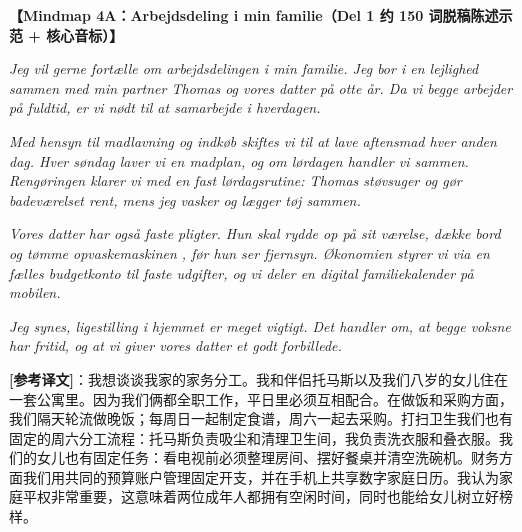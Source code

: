 \begin{answerbox}
\textbf{\color{NCDNavy}【Mindmap 4A：Arbejdsdeling i min familie（Del 1 约 150 词脱稿陈述示范 + 核心音标）】}

\vspace{0.18em}
\textit{Jeg vil gerne fortælle om arbejdsdelingen  i min familie. Jeg bor i en lejlighed sammen med min partner Thomas og vores datter på otte år. Da vi begge arbejder på fuldtid, er vi nødt til at samarbejde i hverdagen.}

\vspace{0.18em}
\textit{Med hensyn til madlavning og indkøb  skiftes vi til at lave aftensmad hver anden dag. Hver søndag laver vi en madplan, og om lørdagen handler vi sammen. Rengøringen klarer vi med en fast lørdagsrutine: Thomas støvsuger og gør badeværelset rent, mens jeg vasker og lægger tøj sammen.}

\vspace{0.18em}
\textit{Vores datter har også faste pligter. Hun skal rydde op på sit værelse, dække bord og tømme opvaskemaskinen , før hun ser fjernsyn. Økonomien  styrer vi via en fælles budgetkonto til faste udgifter, og vi deler en digital familiekalender på mobilen.}

\vspace{0.18em}
\textit{Jeg synes, ligestilling  i hjemmet er meget vigtigt. Det handler om, at begge voksne har fritid, og at vi giver vores datter et godt forbillede.}

\vspace{0.2em}
\small\textbf{[参考译文]}：我想谈谈我家的家务分工。我和伴侣托马斯以及我们八岁的女儿住在一套公寓里。因为我们俩都全职工作，平日里必须互相配合。在做饭和采购方面，我们隔天轮流做晚饭；每周日一起制定食谱，周六一起去采购。打扫卫生我们也有固定的周六分工流程：托马斯负责吸尘和清理卫生间，我负责洗衣服和叠衣服。我们的女儿也有固定任务：看电视前必须整理房间、摆好餐桌并清空洗碗机。财务方面我们用共同的预算账户管理固定开支，并在手机上共享数字家庭日历。我认为家庭平权非常重要，这意味着两位成年人都拥有空闲时间，同时也能给女儿树立好榜样。


\end{answerbox}
